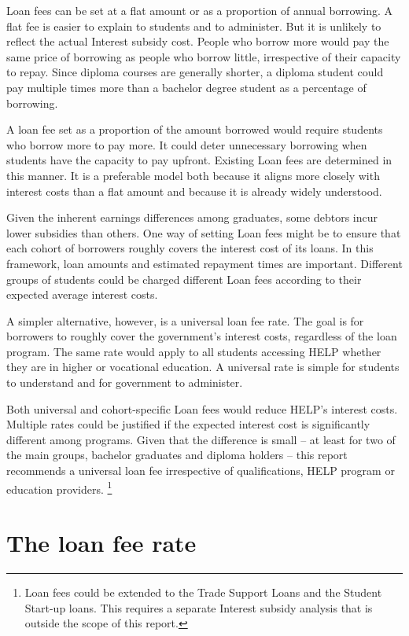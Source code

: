 \documentclass[embargoed]{grattan}
\begin{document}
\Gls{Loan fees} can be set at a flat amount or as a proportion of annual borrowing.
A flat fee is easier to explain to students and to administer.
But it is unlikely to reflect the actual \gls{Interest subsidy} cost.
People who borrow more would pay the same price of borrowing as people who borrow little, irrespective of their capacity to repay.
Since diploma courses are generally shorter, a diploma student could pay multiple times more than a bachelor degree student as a percentage of borrowing.

A loan fee set as a proportion of the amount borrowed would require students who borrow more to pay more.
It could deter unnecessary borrowing when students have the capacity to pay upfront.
Existing \gls{Loan fees} are determined in this manner.
It is a preferable model both because it aligns more closely with interest costs than a flat amount and because it is already widely understood.

Given the inherent earnings differences among graduates, some debtors incur lower subsidies than others.
One way of setting \gls{Loan fees} might be to ensure that each cohort of borrowers roughly covers the interest cost of its loans.
In this framework, loan amounts and estimated repayment times are important.
Different groups of students could be charged different \gls{Loan fees} according to their expected average interest costs.

A simpler alternative, however, is a universal loan fee rate.
The goal is for borrowers to roughly cover the government's interest costs, regardless of the loan program.
The same rate would apply to all students accessing \gls{HELP} whether they are in higher or vocational education.
A universal rate is simple for students to understand and for government to administer.

Both universal and cohort-specific \gls{Loan fees} would reduce \gls{HELP}'s interest costs.
Multiple rates could be justified if the expected interest cost is significantly different among programs.
Given that the difference is small -- at least for two of the main groups, bachelor graduates and diploma holders -- this report recommends a universal loan fee irrespective of qualifications, \gls{HELP} program or education providers.%
\footnote{\Gls{Loan fees} could be extended to the Trade Support Loans and the Student Start-up loans.
This requires a separate \gls{Interest subsidy} analysis that is outside the scope of this report.}

\section{The loan fee rate}\label{sec:the-loan-fee-rate}
\end{document}
